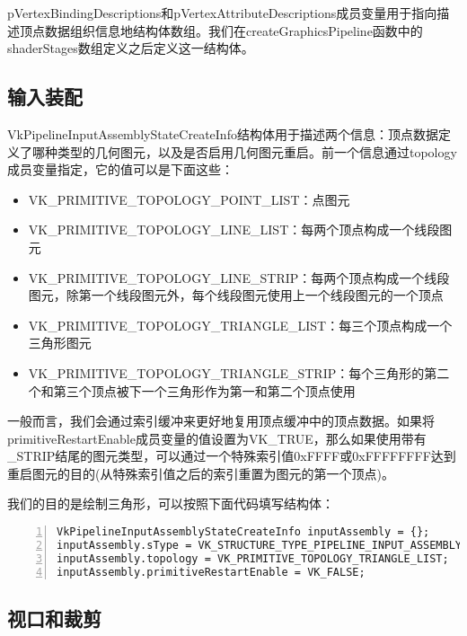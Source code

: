 \documentclass{ctexart}
\begin{document}
pVertexBindingDescriptions和pVertexAttributeDescriptions成员变量用于指向描述顶点数据组织信息地结构体数组。我们在createGraphicsPipeline函数中的shaderStages数组定义之后定义这一结构体。

\subsection{输入装配}

VkPipelineInputAssemblyStateCreateInfo结构体用于描述两个信息：顶点数据定义了哪种类型的几何图元，以及是否启用几何图元重启。前一个信息通过topology成员变量指定，它的值可以是下面这些：

\begin{itemize}
	\item VK\_PRIMITIVE\_TOPOLOGY\_POINT\_LIST：点图元
	\item VK\_PRIMITIVE\_TOPOLOGY\_LINE\_LIST：每两个顶点构成一个线段图元
	\item VK\_PRIMITIVE\_TOPOLOGY\_LINE\_STRIP：每两个顶点构成一个线段图元，除第一个线段图元外，每个线段图元使用上一个线段图元的一个顶点
	\item VK\_PRIMITIVE\_TOPOLOGY\_TRIANGLE\_LIST：每三个顶点构成一个三角形图元
	\item VK\_PRIMITIVE\_TOPOLOGY\_TRIANGLE\_STRIP：每个三角形的第二个和第三个顶点被下一个三角形作为第一和第二个顶点使用
\end{itemize}

一般而言，我们会通过索引缓冲来更好地复用顶点缓冲中的顶点数据。如果将primitiveRestartEnable成员变量的值设置为VK\_TRUE，那么如果使用带有\_STRIP结尾的图元类型，可以通过一个特殊索引值0xFFFF或0xFFFFFFFF达到重启图元的目的(从特殊索引值之后的索引重置为图元的第一个顶点)。

我们的目的是绘制三角形，可以按照下面代码填写结构体：

\begin{lstlisting}[language={[ANSI]C},keywordstyle=\color{blue!70},commentstyle=\color{red!50!green!50!blue!50},frame=shadowbox, rulesepcolor=\color{red!20!green!20!blue!20},basicstyle=\small,numbers=left, numberstyle=\tiny,breaklines=true]
VkPipelineInputAssemblyStateCreateInfo inputAssembly = {};
inputAssembly.sType = VK_STRUCTURE_TYPE_PIPELINE_INPUT_ASSEMBLY_STATE_CREATE_INFO;
inputAssembly.topology = VK_PRIMITIVE_TOPOLOGY_TRIANGLE_LIST;
inputAssembly.primitiveRestartEnable = VK_FALSE;
\end{lstlisting}

\subsection{视口和裁剪}
\end{document}
